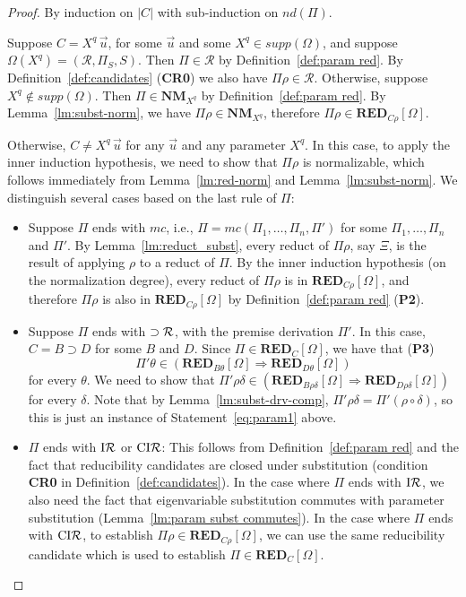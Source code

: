 \documentclass[preprint]{elsarticle}
\def\Rscr{{\mathcal R}}
\newcommand{\indR}{{\rm I}{\cal R}}
\newcommand{\coindR}{{\rm CI}{\cal R}}
\newcommand{\oimpR}{\oimp{\cal R}}
\newcommand{\oimp}{\supset}
\def\RED{{\mathbf{RED}}}
\def\NM{{\mathbf{NM}}}
\begin{document}
\begin{proof}
By induction on $|C|$ with sub-induction on $nd(\Pi)$. 

Suppose $C = X^q\,\vec u$, for some $\vec u$ and some
$X^q \in supp(\Omega)$, and suppose $\Omega(X^q) = (\Rscr, \Pi_S, S)$. 
Then $\Pi \in \Rscr$ by Definition~\ref{def:param red}. 
By Definition~\ref{def:candidates} ({\bf CR0}) we also have
$\Pi\rho \in \Rscr$. Otherwise, suppose $X^q \not \in supp(\Omega)$. 
Then $\Pi \in \NM_{X^q}$ by Definition~\ref{def:param red}.
By Lemma~\ref{lm:subst-norm}, we have $\Pi\rho \in \NM_{X^q}$,
therefore $\Pi\rho \in \RED_{C\rho}[\Omega]$. 

Otherwise, $C \not = X^q \,\vec u$ for any $\vec u$ and any parameter
$X^q$.  In this case, to apply the inner induction hypothesis, we need
to show that $\Pi\rho$ is normalizable, which follows immediately from
Lemma~\ref{lm:red-norm} and Lemma~\ref{lm:subst-norm}. We distinguish
several cases based on the last rule of $\Pi$:

\begin{itemize}
\item Suppose $\Pi$ ends with $mc$, i.e., 
$\Pi = mc(\Pi_1,\ldots,\Pi_n,\Pi')$ for some $\Pi_1,\ldots,\Pi_n$
and $\Pi'$. 
By Lemma~\ref{lm:reduct_subst}, every reduct of $\Pi\rho$, say $\Xi$, 
is the result of applying $\rho$ to a reduct of $\Pi$.  
By the inner induction hypothesis (on
the normalization degree), every reduct of $\Pi\rho$ 
is in $\RED_{C\rho}[\Omega]$, and therefore $\Pi\rho$ is 
also in $\RED_{C\rho}[\Omega]$ by Definition~\ref{def:param red} ({\bf P2}).

\item Suppose $\Pi$ ends with $\oimpR$, with the premise derivation
$\Pi'$. In this case, $C = B \oimp D$ for some $B$ and $D$.
Since $\Pi \in \RED_C[\Omega]$, we have that (\textbf{P3})
\begin{equation}
\label{eq:param1}
\Pi'\theta \in (\RED_{B\theta}[\Omega] \Rightarrow \RED_{D\theta}[\Omega])
\end{equation}
for every $\theta$. 
We need to show that 
$\Pi'\rho\delta \in (\RED_{B\rho\delta}[\Omega] \Rightarrow
\RED_{D\rho\delta}[\Omega])$ 
for every $\delta$. Note that by Lemma~\ref{lm:subst-drv-comp},
$\Pi'\rho\delta = \Pi'(\rho \circ \delta)$, so 
this is just an instance of Statement~\ref{eq:param1} above.


\item $\Pi$ ends with $\indR$ or $\coindR$: This follows from Definition~\ref{def:param red}
and the fact that reducibility candidates are closed under substitution
(condition {\bf CR0} in Definition~\ref{def:candidates}). In the case where 
$\Pi$ ends with $\indR$, we also need the fact
that eigenvariable substitution commutes with parameter substitution
(Lemma~\ref{lm:param subst commutes}). In the case where $\Pi$ ends 
with $\coindR$, to establish $\Pi\rho \in \RED_{C\rho}[\Omega]$,
we can use the same reducibility candidate which is used to establish
$\Pi \in \RED_C[\Omega]$.


\end{itemize}
\end{proof}
\end{document}
